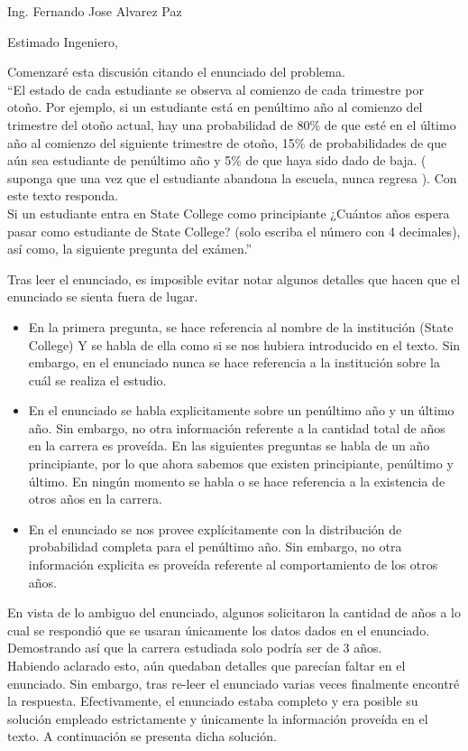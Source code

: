 \documentclass{letter}
\begin{document}
\begin{letter}{Ing. Fernando Jose Alvarez Paz}
  \opening{Estimado Ingeniero,}
Comenzaré esta discusión citando el enunciado del problema. \\
``El estado de cada estudiante se observa al comienzo de cada 
trimestre por otoño. Por ejemplo, si un estudiante está en penúltimo
año al comienzo del trimestre del otoño actual, hay una probabilidad
de 80\% 
de que esté en el último año al comienzo del siguiente trimestre de 
otoño, 15\% de probabilidades de que aún sea estudiante de penúltimo
año y 5\% de que haya sido dado de baja. ( suponga que una vez 
que el estudiante abandona la escuela, nunca regresa ). Con este texto
responda. \\
Si un estudiante entra en State College como principiante
¿Cuántos años espera pasar como estudiante de State College? 
(solo escriba el número con 4 decimales), así como, la siguiente 
pregunta del exámen.''

Tras leer el enunciado, es imposible evitar notar algunos detalles que
hacen que el enunciado se sienta fuera de lugar.
  \begin{itemize} 
    \item En la primera pregunta, se hace referencia al nombre de 
      la institución (State College) Y se habla de ella como 
      si se nos hubiera introducido en el texto. Sin embargo, 
      en el enunciado nunca se hace referencia a la institución 
      sobre la cuál se realiza el estudio.
    \item En el enunciado se habla explicitamente sobre un penúltimo año
      y un último año. Sin 
      embargo, no otra información referente a la cantidad total de 
      años en la carrera es proveída. En las siguientes preguntas 
      se habla de un año principiante, por lo que ahora sabemos que 
      existen principiante, penúltimo y último. En ningún momento
      se habla o se hace referencia a la existencia de otros años en 
      la carrera.
    \item En el enunciado se nos provee explícitamente con 
      la distribución de probabilidad completa para el penúltimo año. 
      Sin embargo, no otra información explicita es proveída referente al 
      comportamiento de los otros años.
  \end{itemize}
  En vista de lo ambiguo del enunciado, 
  algunos solicitaron la cantidad de años a lo cual se respondió 
  que se usaran únicamente los datos dados en el enunciado. Demostrando 
  así que la carrera estudiada solo podría ser de 3 años. \\
  Habiendo aclarado esto, aún quedaban detalles que parecían faltar en el
  enunciado. Sin embargo, tras re-leer el enunciado varias veces
  finalmente encontré 
  la respuesta. Efectivamente, el enunciado estaba completo y era
  posible su solución empleado estrictamente y únicamente la información
  proveída en el texto. A continuación se presenta dicha solución.


\end{letter}
\end{document}
